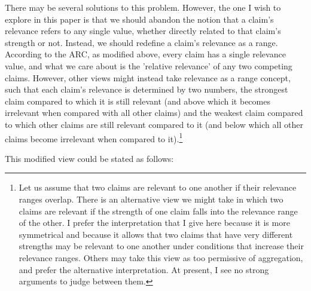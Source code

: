 \documentclass[man,11pt,a4paper]{apa7}
\begin{document}
There may be several solutions to this problem. However, the one I wish to explore in this paper is that we should abandon the notion that a claim's relevance refers to any single value, whether directly related to that claim's strength or not. Instead, we should redefine a claim's relevance as a range. According to the ARC, as modified above, every claim has a single relevance value, and what we care about is the 'relative relevance' of any two competing claims. However, other views might instead take relevance as a range concept, such that each claim's relevance is determined by two numbers, the strongest claim compared to which it is still relevant (and above which it becomes irrelevant when compared with all other claims) and the weakest claim compared to which other claims are still relevant compared to it (and below which all other claims become irrelevant when compared to it).\footnote{Let us assume that two claims are relevant to one another if their relevance ranges overlap. There is an alternative view we might take in which two claims are relevant if the strength of one claim falls into the relevance range of the other. I prefer the interpretation that I give here because it is more symmetrical and because it allows that two claims that have very different strengths may be relevant to one another under conditions that increase their relevance ranges. Others may take this view as too permissive of aggregation, and prefer the alternative interpretation. At present, I see no strong arguments to judge between them.}

This modified view could be stated as follows:
\end{document}
